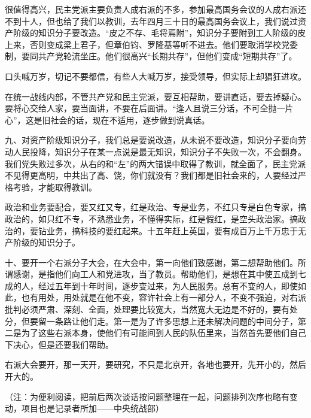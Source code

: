 很值得高兴，民主党派主要负责人成右派的不多，参加最高国务会议的人成右派还不到十人，但也给了我们以教训，去年四月三十日的最高国务会议上，我们说过资产阶级的知识分子要改造。“皮之不存、毛将焉附”，知识分子要附到工人阶级的皮上来，否则变成梁上君子，但章伯钧、罗隆基等听不进去。他们要取消学校党委制，要同共产党轮流坐庄。他们很高兴“长期共存”，但他们变成“短期共存”了。

口头喊万岁，切记不要都信，有些人大喊万岁，接受领导，但实际上却猖狂进攻。

在统一战线内部，不管共产党和民主党派，要互相帮助，要讲直话，要去掉疑心。要将心交给人家，要当面讲，不要在后面讲。“逢人且说三分话，不可全抛一片心”，这是旧社会的话，现在不适用，逐步做到说真话。

九、对资产阶级知识分子，我们总是要说改造，从未说不要改造，知识分子要向劳动人民投降，知识分子在某一点说是最无知识，知识分子不失败一次，不会翻身。我们党失败过多次，从右的和“左”的两大错误中取得了教训，就全面了，民主党派不见得更高明，中共出了高、饶，你们就没有？我们都是旧社会来的，人要经过严格考验，才能取得教训。

政治和业务要配合，要又红又专，红是政治、专是业务，不红只专是白色专家，搞政治的，如只红不专，不熟悉业务，不懂得实际，红是假红，是空头政治家。搞政治的，要钻业务，搞科技的要红起来。十五年赶上英国，要有成百万上千万忠于无产阶级的知识分子。

十、要开一个右派分子大会，在大会中，第一向他们致感谢，第二想帮助他们。所谓感谢，是指他们向工人和党进攻，当了教员。帮助他们，是想在其中使五成到七成的人，经过五年到十年时间，逐步变过来，为人民服务。总有不变的人，即使如此，也有用处，用处就是在他不变，容许社会上有一部分人，不变不强迫，对右派批判必须严肃、深刻、全面，处理要比较宽大，当然宽大无边是不好的，要有处分，但要留一条路让他们走。第一是为了许多思想上还未解决问题的中间分子，第二是为了这些右派本身，使他们有可能间到人民的队伍里来，当然首先要他们自己下决心，但是还要我们帮助。

右派大会要开，那一天开，要研究，不只是北京开，各地也要开，先开小的，然后开大的。

（注：为便利阅读，把前后两次谈话按问题整理在一起，问题排列次序也略有变动，项目也是记录者所加——中央统战部）


